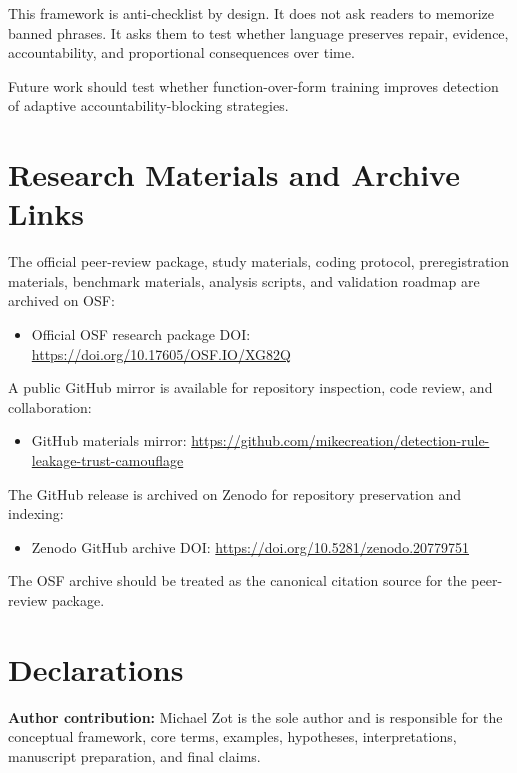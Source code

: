 \documentclass[11pt, letterpaper]{article}
\newcommand{\term}[1]{\textbf{#1}}
\begin{document}
This framework is anti-checklist by design. It does not ask readers to memorize banned phrases. It asks them to test whether language preserves repair, evidence, accountability, and proportional consequences over time.

Future work should test whether function-over-form training improves detection of adaptive accountability-blocking strategies.


\section*{Research Materials and Archive Links}

The official peer-review package, study materials, coding protocol, preregistration materials, benchmark materials, analysis scripts, and validation roadmap are archived on OSF:

\begin{itemize}
    \item Official OSF research package DOI: \url{https://doi.org/10.17605/OSF.IO/XG82Q}
\end{itemize}

A public GitHub mirror is available for repository inspection, code review, and collaboration:

\begin{itemize}
    \item GitHub materials mirror: \url{https://github.com/mikecreation/detection-rule-leakage-trust-camouflage}
\end{itemize}

The GitHub release is archived on Zenodo for repository preservation and indexing:

\begin{itemize}
    \item Zenodo GitHub archive DOI: \url{https://doi.org/10.5281/zenodo.20779751}
\end{itemize}

The OSF archive should be treated as the canonical citation source for the peer-review package.


\section*{Declarations}

\term{Author contribution:} Michael Zot is the sole author and is responsible for the conceptual framework, core terms, examples, hypotheses, interpretations, manuscript preparation, and final claims.
\end{document}

